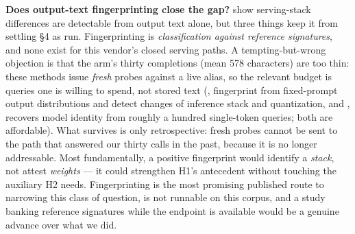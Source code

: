 \textbf{Does output-text fingerprinting close the gap?} \citet{wimbauer2026fingerprintinginferencesystemslarge} show serving-stack differences are detectable from output text alone, but three things keep it from settling \S4 as run. Fingerprinting is \emph{classification against reference signatures}, and none exist for this vendor's closed serving paths. A tempting-but-wrong objection is that the arm's thirty completions (mean 578 characters) are too thin: these methods issue \emph{fresh} probes against a live alias, so the relevant budget is queries one is willing to spend, not stored text (\citealp{leshin2026behavioralfingerprintsllmendpoint}, fingerprint from fixed-prompt output distributions and detect changes of inference stack and quantization, and \citealp{bruckner2026tokenenoughfingerprintingverifying}, recovers model identity from roughly a hundred single-token queries; both are affordable). What survives is only retrospective: fresh probes cannot be sent to the path that answered our thirty calls in the past, because it is no longer addressable. Most fundamentally, a positive fingerprint would identify a \emph{stack}, not attest \emph{weights} --- it could strengthen H1's antecedent without touching the auxiliary H2 needs. Fingerprinting is the most promising published route to narrowing this class of question, is not runnable on this corpus, and a study banking reference signatures while the endpoint is available would be a genuine advance over what we did.

